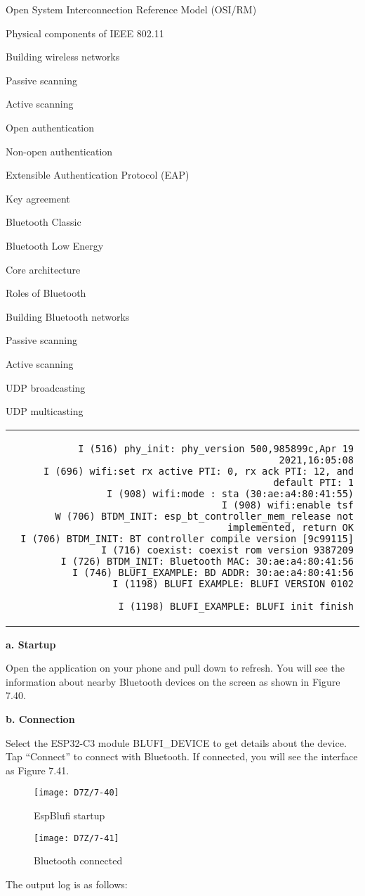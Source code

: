\documentclass[a4paper,12pt]{book}
\begin{document}
\begin{term}{Open System Interconnection Reference Model (OSI/RM)}
\begin{term}{Physical components of IEEE 802.11}
\begin{term}{Building wireless networks}
\begin{term}{Passive scanning}
\begin{term}{Active scanning}
\begin{term}{Open authentication}
\begin{term}{Non-open authentication}
\begin{term}{Extensible Authentication Protocol (EAP)}
\begin{term}{Key agreement}
\begin{term}{Bluetooth Classic}
\begin{term}{Bluetooth Low Energy}
\begin{term}{Core architecture}
\begin{term}{Roles of Bluetooth}
\begin{term}{Building Bluetooth networks}
\begin{term}{Passive scanning}
\begin{term}{Active scanning}
\begin{term}{UDP broadcasting}
\begin{term}{UDP multicasting}
\fontsize{10pt}{10pt}\selectfont
\begin{tabular}{d}
\vspace{2pt}
\begin{verbatim}
I (516) phy_init: phy_version 500,985899c,Apr 19 2021,16:05:08
I (696) wifi:set rx active PTI: 0, rx ack PTI: 12, and default PTI: 1
I (908) wifi:mode : sta (30:ae:a4:80:41:55)
I (908) wifi:enable tsf
W (706) BTDM_INIT: esp_bt_controller_mem_release not implemented, return OK
I (706) BTDM_INIT: BT controller compile version [9c99115]
I (716) coexist: coexist rom version 9387209
I (726) BTDM_INIT: Bluetooth MAC: 30:ae:a4:80:41:56
I (746) BLUFI_EXAMPLE: BD ADDR: 30:ae:a4:80:41:56
I (1198) BLUFI_EXAMPLE: BLUFI VERSION 0102
\end{verbatim}
\verb|I (1198) BLUFI_EXAMPLE: BLUFI init finish|
\end{tabular}



\textbf{a. Startup}

Open the application on your phone and pull down to refresh. You will see the information about nearby Bluetooth devices on the screen as shown in Figure 7.40.

\textbf{b. Connection}

Select the ESP32-C3 module BLUFI\_DEVICE to get details about the device. Tap “Connect” to connect with Bluetooth. If connected, you will see the interface as Figure 7.41.

\begin{figure}[!h]
  \Centering
  \begin{minipage}[b]{0.4\textwidth}
    \texttt{[image: D7Z/7-40]}
    \caption{EspBlufi startup}
  \end{minipage}\hspace{2em}
  \begin{minipage}[b]{0.4\textwidth}
    \texttt{[image: D7Z/7-41]}
    \caption{Bluetooth connected}
  \end{minipage}
\end{figure}

The output log is as follows:



\end{term}
\end{term}
\end{term}
\end{term}
\end{term}
\end{term}
\end{term}
\end{term}
\end{term}
\end{term}
\end{term}
\end{term}
\end{term}
\end{term}
\end{term}
\end{term}
\end{term}
\end{term}
\end{document}
